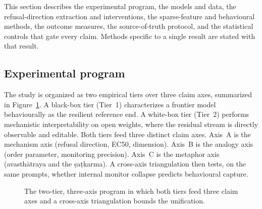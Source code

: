 This section describes the experimental program, the models and data, the
refusal-direction extraction and interventions, the sparse-feature and behavioural
methods, the outcome measures, the source-of-truth protocol, and the statistical
controls that gate every claim. Methods specific to a single result are stated with
that result.

\subsection{Experimental program}
The study is organized as two empirical tiers over three claim axes, summarized in
Figure~\ref{fig:program}. A black-box tier (Tier~1) characterizes a frontier model
behaviourally as the resilient reference end. A white-box tier (Tier~2) performs
mechanistic interpretability on open weights, where the residual stream is directly
observable and editable. Both tiers feed three distinct claim axes. Axis~A is the
mechanism axis (refusal direction, EC50, dimension). Axis~B is the analogy axis
(order parameter, monitoring precision). Axis~C is the metaphor axis (avasth\=atraya
and the \d{s}a\d{t}karma). A cross-axis triangulation then tests, on the same
prompts, whether internal monitor collapse predicts behavioural capture.

\begin{figure}[h]
\centering
{}
\caption{The two-tier, three-axis program in which both tiers feed three claim axes
and a cross-axis triangulation bounds the unification.}
\label{fig:program}
\end{figure}

